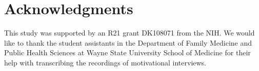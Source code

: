 \documentclass{amia_summit_2018}
\begin{document}
\section*{Acknowledgments}
This study was supported by an R21 grant DK108071 from the NIH. We would like to thank the student assistants in the Department of Family Medicine and Public Health Sciences at Wayne State University School of Medicine for their help with transcribing the recordings of motivational interviews. 
\pagebreak



\end{document}
